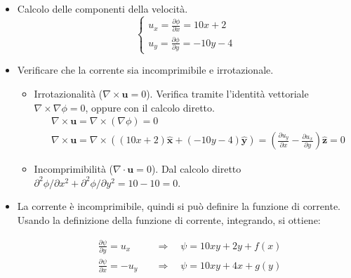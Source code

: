 \begin{itemize}

\item Calcolo delle componenti della velocità.
\begin{equation}
  \begin{cases}
    u_x = \frac{\partial \phi}{\partial x} = 10 x + 2 \\
    u_y = \frac{\partial \phi}{\partial y} = -10 y - 4
  \end{cases}
\end{equation}

\item Verificare che la corrente sia incomprimibile e irrotazionale.
  \begin{itemize}
    \item Irrotazionalità ($\nabla \times \bm{u} = 0$). Verifica tramite l'identità vettoriale $\nabla \times \nabla \phi = 0$, oppure con il calcolo diretto.
    \begin{equation}
    \begin{aligned}
      & \nabla \times \bm{u} = \nabla \times (\nabla \phi) = 0 \\
      & \nabla \times \bm{u} = \nabla \times ( (10x+2)\hat{\bm{x}} + (-10y-4)\hat{\bm{y}} ) = 
      \displaystyle \left(\frac{\partial u_y}{\partial x} - \frac{\partial u_x}{\partial y} \right)\hat{\bm{z}} = 0
    \end{aligned}
    \end{equation}
        
    \item Incomprimibilità ($\nabla \cdot \bm{u} = 0$). Dal calcolo diretto $\partial^2 \phi /\partial x^2 + \partial^2 \phi /\partial y^2=10-10=0$.
    
  \end{itemize}
  
  \item La corrente è incomprimibile, quindi si può definire la funzione di corrente. Usando la definizione della funzione di corrente, integrando, si ottiene:
  
  \begin{equation}
  \begin{aligned}
    &\frac{\partial \psi}{\partial y} = u_x   &\quad \Rightarrow \quad \psi = 10xy+2y+f(x)\\
    &\frac{\partial \psi}{\partial x} = -u_y  &\quad \Rightarrow \quad \psi = 10xy+4x+g(y)
  \end{aligned}
  \end{equation}
  

\end{itemize}
